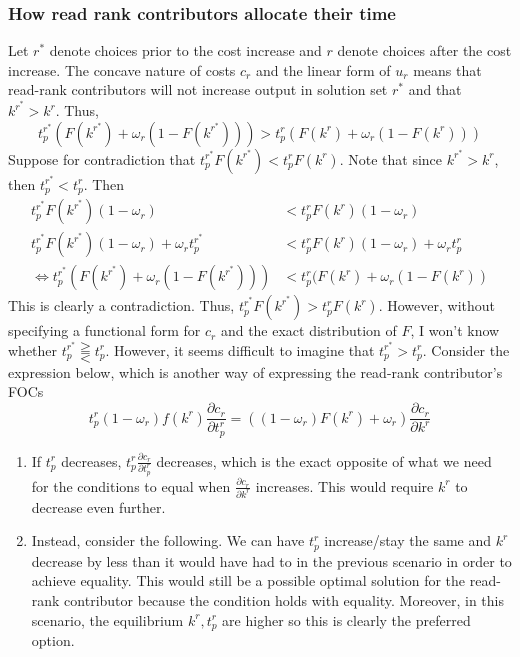 \documentclass[source/paper/main.tex]{subfiles}
\begin{document}
\subsubsection{How read rank contributors allocate their time}
Let $r^*$ denote choices prior to the cost increase and $r$ denote choices after the cost increase. The concave nature of costs $c_r$ and the linear form of $u_r$ means that read-rank contributors will not increase output in solution set $r^*$ and that $k^{r^*} > k^r$. Thus, 
$$ t_p^{r^*}(F(k^{r^*}) + \omega_r(1-F(k^{r^*})))  > t_p^r(F(k^r) + \omega_r(1-F(k^r)))$$
Suppose for contradiction that $t_p^{r^*} F(k^{r^*}) < t_p^r F(k^r)$. Note that since $k^{r^*} > k^r$, then $t_p^{r^*} < t_p^r$. Then
\begin{align*}
t_p^{r^*} F(k^{r^*})(1-\omega_r)  &< t_p^r F(k^r)(1-\omega_r)\\
t_p^{r^*} F(k^{r^*})(1-\omega_r) + \omega_r t_p^{r^*}  &< t_p^r F(k^r)(1-\omega_r) + \omega_r t_p^r \\
\iff t_p^{r^*} (F(k^{r^*}) + \omega_r (1-F(k^{r^*})))  &< t_p^r(F(k^r) + \omega_r (1-F(k^r)) 
\end{align*}
This is clearly a contradiction. Thus, $t_p^{r^*} F(k^{r^*}) > t_p^r F(k^r)$. However, without specifying a functional form for $c_r$ and the exact distribution of $F$, I won't know whether $t_p^{r^*} \gtreqqless t_p^r$. However, 
it seems difficult to imagine that $t_p^{r^*} > t_p^r$. Consider the expression below, which is another way of expressing the read-rank contributor's FOCs 
$$t_p^r(1-\omega_r)f(k^r) \frac{\partial c_r}{\partial t_p^r} = ((1-\omega_r)F(k^r) + \omega_r) \frac{\partial c_r}{\partial k^r}$$
\begin{enumerate}
    \item If $t_p^r$ decreases, $t_p^r\frac{\partial c_r}{\partial t_p^r}$ decreases, which is the exact opposite of what we need for the conditions to equal when $\frac{\partial c_r}{\partial k^r}$ increases. This would require $k^r$ to decrease even further.
    \item Instead, consider the following. We can have $t_p^r$ increase/stay the same and $k^r$ decrease by less than it would have had to in the previous scenario in order to achieve equality. This would still be a possible optimal solution for the read-rank contributor because the condition holds with equality. Moreover, in this scenario, the equilibrium $k^r, t_p^r$ are higher so this is clearly the preferred option. 
\end{enumerate}
\end{document}

